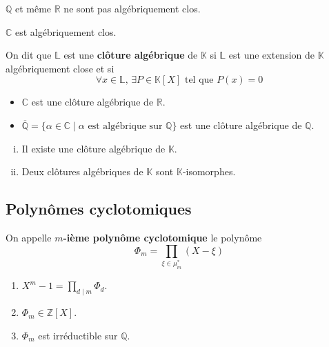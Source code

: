	\begin{cexample}
		$\mathbb{Q}$ et même $\mathbb{R}$ ne sont pas algébriquement clos.
	\end{cexample}
	
	\begin{theorem}
		$\mathbb{C}$ est algébriquement clos.
	\end{theorem}
	
	\begin{definition}
		On dit que $\mathbb{L}$ est une \textbf{clôture algébrique} de $\mathbb{K}$ si $\mathbb{L}$ est une extension de $\mathbb{K}$ algébriquement close et si
		\[ \forall x \in \mathbb{L}, \, \exists P \in \mathbb{K}[X] \text{ tel que } P(x) = 0 \]
	\end{definition}
	
	\begin{example}
		\begin{itemize}
			\item $\mathbb{C}$ est une clôture algébrique de $\mathbb{R}$.
			\item $\overline{\mathbb{Q}} = \{ \alpha \in \mathbb{C} \mid \alpha \text{ est algébrique sur } \mathbb{Q} \}$ est une clôture algébrique de $\mathbb{Q}$.
		\end{itemize}
	\end{example}
	
	\begin{theorem}[Steinitz]
		\begin{enumerate}[(i)]
			\item Il existe une clôture algébrique de $\mathbb{K}$.
			\item Deux clôtures algébriques de $\mathbb{K}$ sont $\mathbb{K}$-isomorphes.
		\end{enumerate}
	\end{theorem}
	
	\subsection{Polynômes cyclotomiques}
	
	\begin{definition}
		On appelle \textbf{$m$-ième polynôme cyclotomique} le polynôme
		\[ \Phi_m = \prod_{\xi \in \mu_m^*} (X - \xi) \]
	\end{definition}
	
	\begin{theorem}
		\begin{enumerate}
			\item $X^m - 1 = \prod_{d \mid m} \Phi_d$.
			\item $\Phi_m \in \mathbb{Z}[X]$.
			\item $\Phi_m$ est irréductible sur $\mathbb{Q}$.
		\end{enumerate}
	\end{theorem}
	
